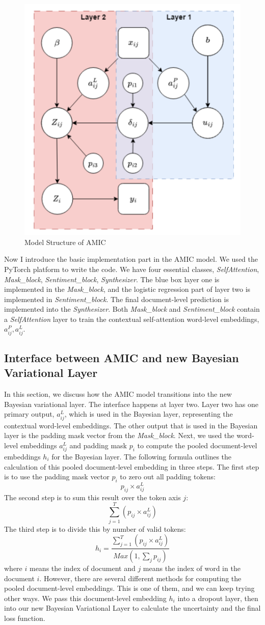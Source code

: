 \documentclass{article}
\begin{document}
\begin{figure}
    \centering
    \includegraphics[width=0.5\linewidth]{amic.png}
    \caption{Model Structure of AMIC}
    \label{fig:amic}
\end{figure}
Now I introduce the basic implementation part in the AMIC model. We used the PyTorch platform to write the code. We have four essential classes, \textit{SelfAttention}, \textit{Mask\_block}, \textit{Sentiment\_block}, \textit{Synthesizer}. The blue box layer one is implemented in the \textit{Mask\_block}, and the logistic regression part of layer two is implemented in \textit{Sentiment\_block}. The final document-level prediction is implemented into the \textit{Synthesizer}. Both \textit{Mask\_block} and \textit{Sentiment\_block} contain a \textit{SelfAttention} layer to train the contextual self-attention word-level embeddings, $a_{ij}^P, a_{ij}^L$. 

\subsection{Interface between AMIC and new Bayesian Variational Layer}
In this section, we discuss how the AMIC model transitions into the new Bayesian variational layer. The interface happens at layer two. Layer two has one primary output, $a_{ij}^L$, which is used in the Bayesian layer, representing the contextual word-level embeddings. The other output that is used in the Bayesian layer is the padding mask vector from the \textit{Mask\_block}. Next, we used the word-level embeddings $a_{ij}^L$ and padding mask $p_i$ to compute the pooled document-level embeddings $h_i$ for the Bayesian layer. The following formula outlines the calculation of this pooled document-level embedding in three steps. The first step is to use the padding mask vector $p_{i}$ to zero out all padding tokens: $$p_{ij} \times a_{ij}^L$$ The second step is to sum this result over the token axis $j$: $$\sum_{j=1}^T (p_{ij} \times a_{ij}^L)$$ The third step is to divide this by number of valid tokens: $$h_i=\frac{\sum_{j=1}^T (p_{ij} \times a_{ij}^L)}{Max(1,\sum_j p_{ij})}$$ where $i$ means the index of document and $j$ means the index of word in the document $i$. However, there are several different methods for computing the pooled document-level embeddings. This is one of them, and we can keep trying other ways. We pass this document-level embedding $h_i$ into a dropout layer, then into our new Bayesian Variational Layer to calculate the uncertainty and the final loss function. 
\end{document}
